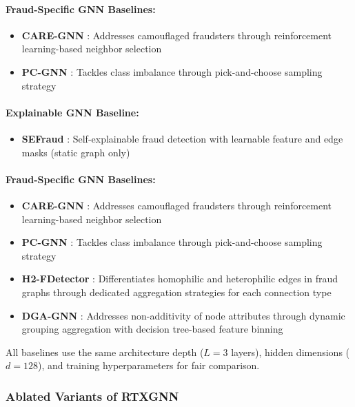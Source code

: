 \paragraph{Fraud-Specific GNN Baselines:}
\begin{itemize}
    \item \textbf{CARE-GNN} \citep{dou2020caregnn}: Addresses camouflaged fraudsters through reinforcement learning-based neighbor selection
    \item \textbf{PC-GNN} \citep{liu2021pcgnn}: Tackles class imbalance through pick-and-choose sampling strategy
\end{itemize}

\paragraph{Explainable GNN Baseline:}
\begin{itemize}
    \item \textbf{SEFraud} \citep{li2024sefraud}: Self-explainable fraud detection with learnable feature and edge masks (static graph only)
\end{itemize}

\paragraph{Fraud-Specific GNN Baselines:}
\begin{itemize}
    \item \textbf{CARE-GNN} \citep{dou2020caregnn}: Addresses camouflaged fraudsters through reinforcement learning-based neighbor selection
    \item \textbf{PC-GNN} \citep{liu2021pcgnn}: Tackles class imbalance through pick-and-choose sampling strategy
    \item \textbf{H2-FDetector} \citep{shi2022h2fdetector}: Differentiates homophilic and heterophilic edges in fraud graphs through dedicated aggregation strategies for each connection type
    \item \textbf{DGA-GNN} \citep{duan2024dgagnn}: Addresses non-additivity of node attributes through dynamic grouping aggregation with decision tree-based feature binning
\end{itemize}

All baselines use the same architecture depth ($L=3$ layers), hidden dimensions ($d=128$), and training hyperparameters for fair comparison.

\subsubsection{Ablated Variants of RTXGNN}

